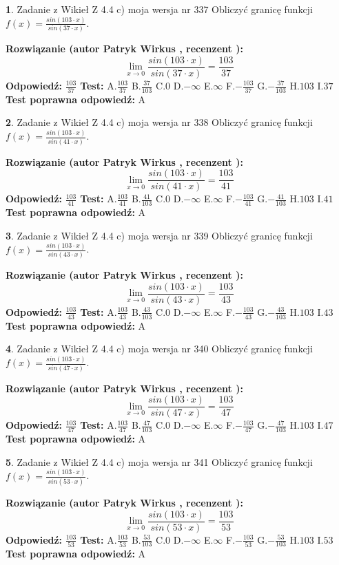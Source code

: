 \documentclass[12pt, a4paper]{article}
\theoremstyle{definition} %
\newtheorem{zad}{}
\newcommand{\zadStart}[1]{\begin{zad}#1\newline}
\newcommand{\zadStop}{\end{zad}}
\newcommand{\rozwStart}[2]{\noindent \textbf{Rozwiązanie (autor #1 , recenzent #2): }\newline}
\newcommand{\rozwStop}{\newline}
\newcommand{\odpStart}{\noindent \textbf{Odpowiedź:}\newline}
\newcommand{\odpStop}{\newline}
\newcommand{\testStart}{\noindent \textbf{Test:}\newline}
\newcommand{\testStop}{\newline}
\newcommand{\kluczStart}{\noindent \textbf{Test poprawna odpowiedź:}\newline}
\newcommand{\kluczStop}{\newline}
\begin{document}
\zadStart{Zadanie z Wikieł Z 4.4 c) moja wersja nr 337}
Obliczyć granicę funkcji $f(x)=\frac{sin(103\cdot x)}{sin(37\cdot x)}$.
\zadStop
\rozwStart{Patryk Wirkus}{}
$$\lim\limits_{x\to 0}\frac{sin(103\cdot x)}{sin(37\cdot x)}=
\frac{103}{37}$$
\rozwStop
\odpStart
$\frac{103}{37}$
\odpStop
\testStart
A.$\frac{103}{37}$
B.$\frac{37}{103}$
C.$0$
D.$-\infty$
E.$\infty$
F.$-\frac{103}{37}$
G.$-\frac{37}{103}$
H.$103$
I.$37$
\testStop
\kluczStart
A
\kluczStop



\zadStart{Zadanie z Wikieł Z 4.4 c) moja wersja nr 338}
Obliczyć granicę funkcji $f(x)=\frac{sin(103\cdot x)}{sin(41\cdot x)}$.
\zadStop
\rozwStart{Patryk Wirkus}{}
$$\lim\limits_{x\to 0}\frac{sin(103\cdot x)}{sin(41\cdot x)}=
\frac{103}{41}$$
\rozwStop
\odpStart
$\frac{103}{41}$
\odpStop
\testStart
A.$\frac{103}{41}$
B.$\frac{41}{103}$
C.$0$
D.$-\infty$
E.$\infty$
F.$-\frac{103}{41}$
G.$-\frac{41}{103}$
H.$103$
I.$41$
\testStop
\kluczStart
A
\kluczStop



\zadStart{Zadanie z Wikieł Z 4.4 c) moja wersja nr 339}
Obliczyć granicę funkcji $f(x)=\frac{sin(103\cdot x)}{sin(43\cdot x)}$.
\zadStop
\rozwStart{Patryk Wirkus}{}
$$\lim\limits_{x\to 0}\frac{sin(103\cdot x)}{sin(43\cdot x)}=
\frac{103}{43}$$
\rozwStop
\odpStart
$\frac{103}{43}$
\odpStop
\testStart
A.$\frac{103}{43}$
B.$\frac{43}{103}$
C.$0$
D.$-\infty$
E.$\infty$
F.$-\frac{103}{43}$
G.$-\frac{43}{103}$
H.$103$
I.$43$
\testStop
\kluczStart
A
\kluczStop



\zadStart{Zadanie z Wikieł Z 4.4 c) moja wersja nr 340}
Obliczyć granicę funkcji $f(x)=\frac{sin(103\cdot x)}{sin(47\cdot x)}$.
\zadStop
\rozwStart{Patryk Wirkus}{}
$$\lim\limits_{x\to 0}\frac{sin(103\cdot x)}{sin(47\cdot x)}=
\frac{103}{47}$$
\rozwStop
\odpStart
$\frac{103}{47}$
\odpStop
\testStart
A.$\frac{103}{47}$
B.$\frac{47}{103}$
C.$0$
D.$-\infty$
E.$\infty$
F.$-\frac{103}{47}$
G.$-\frac{47}{103}$
H.$103$
I.$47$
\testStop
\kluczStart
A
\kluczStop



\zadStart{Zadanie z Wikieł Z 4.4 c) moja wersja nr 341}
Obliczyć granicę funkcji $f(x)=\frac{sin(103\cdot x)}{sin(53\cdot x)}$.
\zadStop
\rozwStart{Patryk Wirkus}{}
$$\lim\limits_{x\to 0}\frac{sin(103\cdot x)}{sin(53\cdot x)}=
\frac{103}{53}$$
\rozwStop
\odpStart
$\frac{103}{53}$
\odpStop
\testStart
A.$\frac{103}{53}$
B.$\frac{53}{103}$
C.$0$
D.$-\infty$
E.$\infty$
F.$-\frac{103}{53}$
G.$-\frac{53}{103}$
H.$103$
I.$53$
\testStop
\kluczStart
A
\kluczStop
\end{document}
